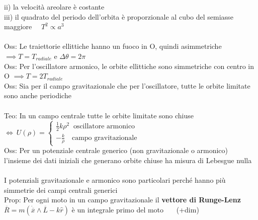 \documentclass{article}
\theoremstyle{unnumbered}
\theoremstyle{unnumbered1}
\begin{document}
ii) la velocità areolare è costante\\
iii) il quadrato del periodo dell'orbita è proporzionale al cubo del semiasse maggiore \ \ $T^2\propto a^3$\\ \\
%
%
%
Oss: Le traiettorie ellittiche hanno un fuoco in O, quindi asimmetriche $\implies T=T_{radiale}$ e $\Delta\theta=2\pi$\\
%
Oss: Per l'oscillatore armonico, le orbite ellittiche sono simmetriche con centro in O $\implies T=2T_{radiale}$\\
%
Oss: Sia per il campo gravitazionale che per l'oscillatore, tutte le orbite limitate sono anche periodiche \\ \\
%
%
%
Teo: In un campo centrale tutte le orbite limitate sono chiuse $\Longleftrightarrow \ U(\rho)=\begin{cases} \frac{1}{2}k\rho^2 \ \text{ oscillatore armonico}\\ -\frac{k}{\rho} \ \ \ \text{ campo gravitazionale} \end{cases}$\\
%
Oss: Per un potenziale centrale generico (non gravitazionale o armonico)\\
\phantom{Oss: }l'insieme dei dati iniziali che generano orbite chiuse ha misura di Lebesgue nulla \\ \\
%
%
%
I potenziali gravitazionale e armonico sono particolari perché hanno più simmetrie dei campi centrali generici\\
Prop: Per ogni moto in un campo gravitazionale il \textbf{vettore di Runge-Lenz} \\
\phantom{Prop: }$\overline{R}= m(\dot{\overline{x}}\wedge\overline{L}-k\hat{r})$ è un integrale primo del moto \ \ \ (+dim)


\end{document}
